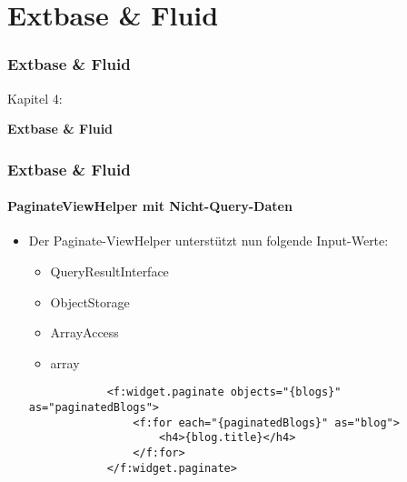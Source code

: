 %

\section{Extbase \& Fluid}
\begin{frame}[fragile]
	\frametitle{Extbase \& Fluid}

	\begin{center}\huge{Kapitel 4:}\end{center}
	\begin{center}\huge{\color{typo3darkgrey}\textbf{Extbase \& Fluid}}\end{center}

\end{frame}


\begin{frame}[fragile]
	\frametitle{Extbase \& Fluid}
	\framesubtitle{PaginateViewHelper mit Nicht-Query-Daten}

	\lstset{
		basicstyle=\tiny\ttfamily
	}

	\begin{itemize}

		\item Der Paginate-ViewHelper unterstützt nun folgende Input-Werte:
		\begin{itemize}
			\item QueryResultInterface
			\item ObjectStorage
			\item ArrayAccess
			\item array
		\end{itemize}

		\begin{lstlisting}
			<f:widget.paginate objects="{blogs}" as="paginatedBlogs">
				<f:for each="{paginatedBlogs}" as="blog">
					<h4>{blog.title}</h4>
				</f:for>
			</f:widget.paginate>
			\end{lstlisting}

	\end{itemize}

\end{frame}

